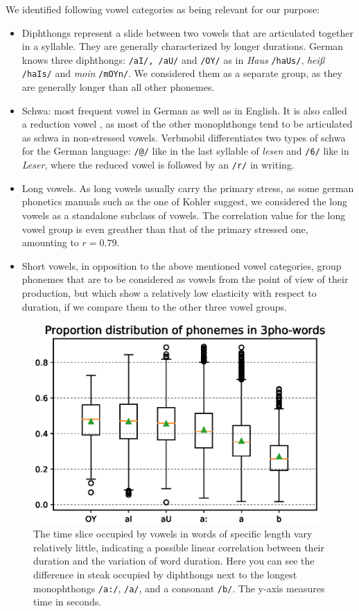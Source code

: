 \documentclass[11pt,a4paper]{scrbook}
\begin{document}
We identified following vowel categories as being relevant for our purpose:

\begin{itemize}
	\item Diphthongs represent a slide between two vowels that are articulated together in a syllable. They are generally characterized by longer durations. German knows three diphthongs: \texttt{/aI/, /aU/} and \texttt{/OY/} as in \textit{Haus} \texttt{/haUs/},  \textit{heiß} \texttt{/haIs/} and \textit{moin} \texttt{/mOYn/}. We considered them as a separate group, as they are generally longer than all other phonemes.
	\item Schwa: most frequent vowel in German as well as in English. It is also called a reduction vowel \cite{Kohler1995}, as most of the other monophthongs tend to be articulated as schwa in non-stressed vowels. Verbmobil differentiates two types of schwa for the German language: \texttt{/@/} like in the last syllable of \textit{lesen} and \texttt{/6/} like in \textit{Leser}, where the reduced vowel is followed by an \texttt{/r/} in writing.
	\item Long vowels. As long vowels usually carry the primary stress, as some german phonetics manuals such as the one of Kohler \cite{Kohler1995} suggest, we considered the long vowels as a standalone subclass of vowels. The correlation value for the long vowel group is even greather than that of the primary stressed one, amounting to $r = 0.79$.
	\item Short vowels, in opposition to the above mentioned vowel categories, group phonemes that are to be considered as vowels from the point of view of their production, but which show a relatively low elasticity with respect to duration, if we compare them to the other three vowel groups.
\end{itemize}

\begin{figure}[htbp]
	\includegraphics[trim=15mm 0mm 15mm 0mm, width=.55\linewidth]{../Graphen/box3_oyauaiaab.eps}
	\centering
	\caption[Proportions of diphthong in 3-phoneme-words]{The time slice occupied by vowels in words of specific length  vary relatively little, indicating a possible linear correlation between their duration and the variation of word duration. Here you can see the difference in steak occupied by diphthongs next to the longest monophthongs \texttt{/a:/}, \texttt{/a/}, and a consonant \texttt{/b/}. The y-axis measures time in seconds.}
	\label{fig:boxplot_prop}
\end{figure}
\end{document}
